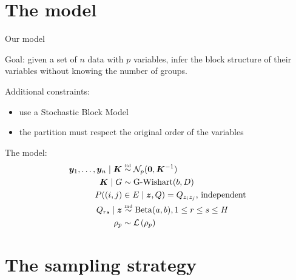 
\section{The model}


\begin{frame}{Our model}

\alert{Goal}: given a set of $n$ data with $p$ variables, infer the block structure of their variables
without knowing the number of groups.

\pause

\alert{Additional constraints}: 
\begin{itemize}
    \item use a Stochastic Block Model    
    \item the partition must respect the original order of the variables
\end{itemize} 

\pause

\alert{The model}: 
\begin{align*}
    \bm{y}_1, \ldots, \bm{y}_n \mid \bm{K} & \overset{\text{\tiny{iid}}}{\sim} \mathcal{N}_p(\mathbf{0}, \bm{K}^{-1} ) \\
    \bm{K} \mid G & \sim \operatorname{G-Wishart}(b, D)\\
    P((i,j)&\in E\mid \bm{z},Q) = Q_{z_{i} z_{j}},\,\text{independent}\\
        Q_{rs} \mid \bm{z} &\overset{\text{\tiny{ind}}}{\sim} \operatorname{Beta}(a,b), 1\leq r\leq s\leq H\\
    \rho_p & \sim \mathcal{L}\left(\rho_p\right)
\end{align*}


\end{frame}


\section{The sampling strategy}

